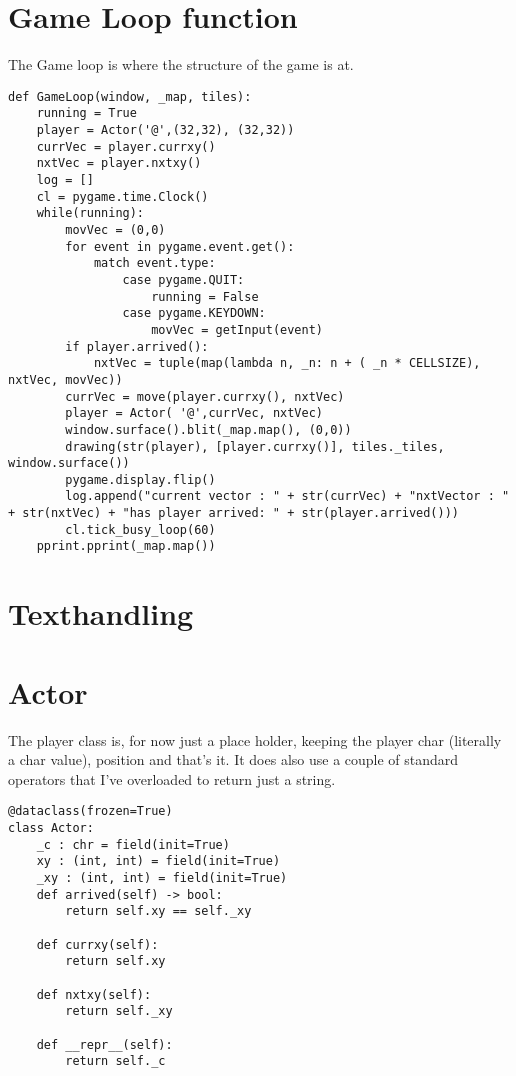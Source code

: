 \documentclass[11pt]{article}
\begin{document}
\section{Game Loop function}
\label{sec:org72f4636}

The Game loop is where the structure of the game is at.

\begin{verbatim}
def GameLoop(window, _map, tiles):
    running = True
    player = Actor('@',(32,32), (32,32))
    currVec = player.currxy()
    nxtVec = player.nxtxy()
    log = []
    cl = pygame.time.Clock()
    while(running):
        movVec = (0,0)
        for event in pygame.event.get():
            match event.type:
                case pygame.QUIT:
                    running = False
                case pygame.KEYDOWN:
                    movVec = getInput(event)
        if player.arrived():
            nxtVec = tuple(map(lambda n, _n: n + ( _n * CELLSIZE), nxtVec, movVec))           
        currVec = move(player.currxy(), nxtVec)
        player = Actor( '@',currVec, nxtVec)
        window.surface().blit(_map.map(), (0,0))
        drawing(str(player), [player.currxy()], tiles._tiles, window.surface())
        pygame.display.flip()
        log.append("current vector : " + str(currVec) + "nxtVector : " + str(nxtVec) + "has player arrived: " + str(player.arrived()))
        cl.tick_busy_loop(60)
    pprint.pprint(_map.map())
\end{verbatim}

\section{Texthandling}
\label{sec:orge73a0bc}



\section{Actor}
\label{sec:org3ae993f}

The player class is, for now just a place holder, keeping the player char (literally a char value), position and that's it. It does also use a couple of standard operators that I've overloaded to return just a string.

\begin{verbatim}
@dataclass(frozen=True)
class Actor:
    _c : chr = field(init=True)
    xy : (int, int) = field(init=True)
    _xy : (int, int) = field(init=True)
    def arrived(self) -> bool:
        return self.xy == self._xy

    def currxy(self):
        return self.xy

    def nxtxy(self):
        return self._xy

    def __repr__(self):
        return self._c
\end{verbatim}
\end{document}
